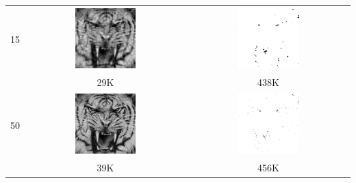\begin{center}
\begin{longtable}{|l|c|c|}
        \hline
        15 & \includegraphics[width=0.4\textwidth]{photos/photo_15.jpg} & \includegraphics[width=0.4\textwidth]{photos/photo_15.png} \\
        & 29K & 438K \\
        \hline
        50 & \includegraphics[width=0.4\textwidth]{photos/photo_50.jpg} & \includegraphics[width=0.4\textwidth]{photos/photo_50.png} \\
        & 39K & 456K \\

\end{longtable}
\end{center}
